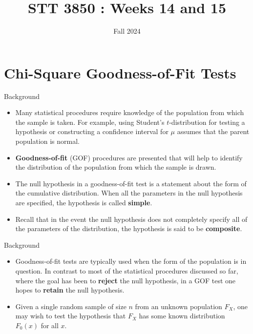 \documentclass[
  ignorenonframetext,
]{beamer}
\title{STT 3850 : Weeks 14 and 15}
\author{Fall 2024}
\date{}
\institute{Appalachian State University}
\begin{document}
\frame{\titlepage}

\hypertarget{chi-square-goodness-of-fit-tests}{%
\section{Chi-Square Goodness-of-Fit
Tests}\label{chi-square-goodness-of-fit-tests}}

\begin{frame}{Background}
\protect\hypertarget{background}{}
\begin{itemize}
\item
  Many statistical procedures require knowledge of the population from
  which the sample is taken. For example, using Student's
  \(t\)-distribution for testing a hypothesis or constructing a
  confidence interval for \(\mu\) assumes that the parent population is
  normal.
\item
  \textbf{Goodness-of-fit} (GOF) procedures are presented that will help
  to identify the distribution of the population from which the sample
  is drawn.
\item
  The null hypothesis in a goodness-of-fit test is a statement about the
  form of the cumulative distribution. When all the parameters in the
  null hypothesis are specified, the hypothesis is called
  \textbf{simple}.
\item
  Recall that in the event the null hypothesis does not completely
  specify all of the parameters of the distribution, the hypothesis is
  said to be \textbf{composite}.
\end{itemize}
\end{frame}

\begin{frame}{Background}
\protect\hypertarget{background-1}{}
\begin{itemize}
\item
  Goodness-of-fit tests are typically used when the form of the
  population is in question. In contrast to most of the statistical
  procedures discussed so far, where the goal has been to
  \textbf{reject} the null hypothesis, in a GOF test one hopes to
  \textbf{retain} the null hypothesis.
\item
  Given a single random sample of size \(n\) from an unknown population
  \(F_X\), one may wish to test the hypothesis that \(F_X\) has some
  known distribution \(F_0(x)\) for all \(x\).
\end{itemize}
\end{frame}
\end{document}
